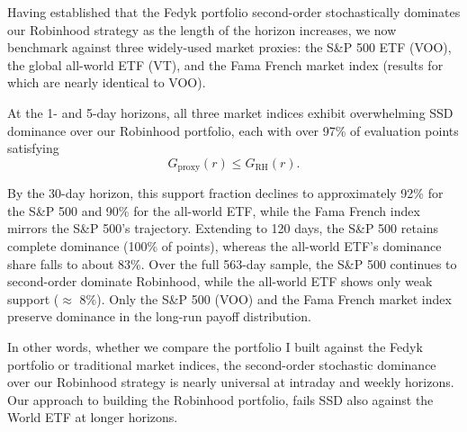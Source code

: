 Having established that the Fedyk portfolio second-order stochastically dominates our Robinhood strategy as the length of the horizon increases, 
we now benchmark against three widely-used market proxies: the S\&P 500 ETF (VOO), the global all-world ETF (VT), and the Fama French market index (results for which are nearly identical to VOO).

At the 1- and 5-day horizons, all three market indices exhibit overwhelming SSD dominance over our Robinhood portfolio, each with over 97\% of evaluation points satisfying
\begin{equation}
    G_{\mathrm{proxy}}(r) \leq G_{\mathrm{RH}}(r).
\end{equation}

By the 30-day horizon, this support fraction declines to approximately 92\% for the S\&P 500 and 90\% for the all-world ETF, while the Fama French index mirrors the S\&P 500's trajectory. 
Extending to 120 days, the S\&P 500 retains complete dominance (100\% of points), whereas the all-world ETF's dominance share falls to about 83\%. 
Over the full 563-day sample, the S\&P 500 continues to second-order dominate Robinhood, while the all-world ETF shows only weak support ($\approx$ 8\%).
Only the S\&P 500 (VOO) and the Fama French market index preserve dominance in the long-run payoff distribution.

In other words, whether we compare the portfolio I built against the Fedyk portfolio or traditional market indices, the second-order stochastic dominance over our Robinhood strategy is nearly universal at intraday and weekly horizons. 
Our approach to building the Robinhood portfolio, fails SSD also against the World ETF at longer horizons.

